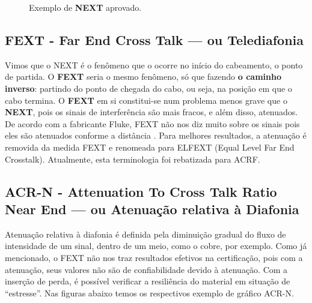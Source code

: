 \documentclass[	DIV=calc,%
							paper=a4,%
							fontsize=12pt,%
							onecolumn]{scrartcl}	 					%
\begin{document}
\begin{figure}[H]
	\noindent{}
	\caption{Exemplo de \textbf{NEXT} aprovado. \cite{next}}
	\label{fig4}
\end{figure}


\subsection{FEXT - Far End Cross Talk --- ou Telediafonia}
Vimos que o NEXT é o fenômeno que o ocorre no início do cabeamento, o ponto de partida. O \textbf{FEXT} seria o mesmo fenômeno, só que fazendo \textbf{o caminho inverso}: partindo do ponto de chegada do cabo, ou seja, na posição em que o cabo termina. O \textbf{FEXT} em si constitui-se num problema menos grave que o \textbf{NEXT}, pois os sinais de interferência são mais fracos, e além disso, atenuados. De acordo com a fabricante Fluke, FEXT não nos diz muito sobre os sinais pois eles são atenuados conforme a distância \cite{understading}. Para melhores resultados, a atenuação é removida da medida FEXT e renomeada para ELFEXT (Equal Level Far End Crosstalk). Atualmente, esta terminologia foi rebatizada para ACRF. 

\subsection{ACR-N - Attenuation To Cross Talk Ratio Near End --- ou Atenuação relativa à Diafonia}
Atenuação relativa à diafonia é definida pela diminuição gradual do fluxo de intensidade de um sinal, dentro de um meio, como o cobre, por exemplo. Como já mencionado, o FEXT não nos traz resultados efetivos na certificação, pois com a atenuação, seus valores não são de confiabilidade devido à atenuação. Com a inserção de perda, é possível verificar a resiliência do material em situação de ``estresse''. Nas figuras abaixo temos os respectivos exemplo de gráfico ACR-N.
\end{document}

